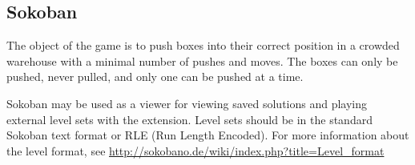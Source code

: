 \subsection{Sokoban}

The object of the game is to push boxes into their correct position in a
crowded warehouse with a minimal number of pushes and moves. The boxes
can only be pushed, never pulled, and only one can be pushed at a time.

Sokoban may be used as a viewer for viewing saved solutions and playing
external level sets with the  extension. Level sets should be in
the standard Sokoban text format or RLE (Run Length Encoded). For more
information about the level format, see
\url{http://sokobano.de/wiki/index.php?title=Level_format}

